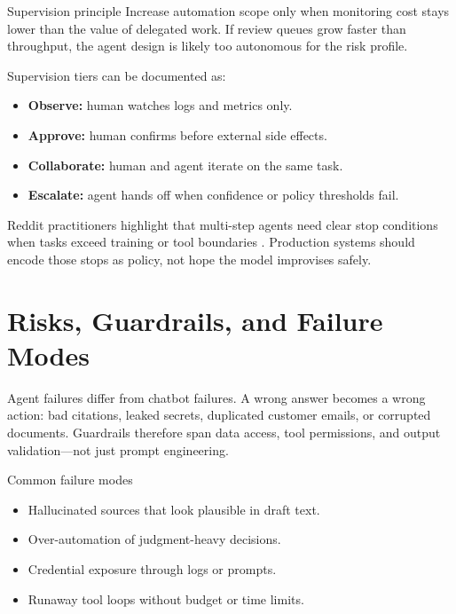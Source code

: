 \begin{warningbox}{Supervision principle}
Increase automation scope only when monitoring cost stays lower than the value of
delegated work. If review queues grow faster than throughput, the agent design is likely
too autonomous for the risk profile.
\end{warningbox}

Supervision tiers can be documented as:
\begin{itemize}
  \item \textbf{Observe:} human watches logs and metrics only.
  \item \textbf{Approve:} human confirms before external side effects.
  \item \textbf{Collaborate:} human and agent iterate on the same task.
  \item \textbf{Escalate:} agent hands off when confidence or policy thresholds fail.
\end{itemize}

Reddit practitioners highlight that multi-step agents need clear stop conditions when
tasks exceed training or tool boundaries \cite{redditcomplextasks}. Production systems
should encode those stops as policy, not hope the model improvises safely.

\section{Risks, Guardrails, and Failure Modes}
\label{sec:risks-guardrails}

Agent failures differ from chatbot failures. A wrong answer becomes a wrong action: bad
citations, leaked secrets, duplicated customer emails, or corrupted documents. Guardrails
therefore span data access, tool permissions, and output validation---not just prompt
engineering.

\begin{warningboxintact}{Common failure modes}
\begin{itemize}
  \item Hallucinated sources that look plausible in draft text.
  \item Over-automation of judgment-heavy decisions.
  \item Credential exposure through logs or prompts.
  \item Runaway tool loops without budget or time limits.
\end{itemize}
\end{warningboxintact}

